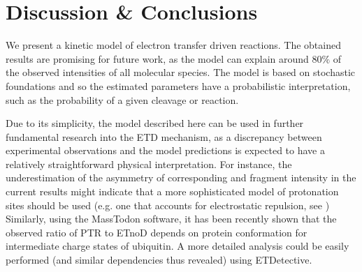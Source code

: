 \documentclass{llncs}
\begin{document}
\section{Discussion \& Conclusions}
We present a kinetic model of electron transfer driven reactions. The obtained results are promising for future work, as the model can explain around $80\%$ of the observed intensities of all molecular species. The model is based on stochastic foundations and so the estimated parameters have a probabilistic interpretation, such as the probability of a given cleavage or reaction.

Due to its simplicity, the model described here can be used in further fundamental research into the ETD mechanism, as a discrepancy between experimental observations and the model predictions is expected to have a relatively straightforward physical interpretation. For instance, the underestimation of the asymmetry of corresponding  and  fragment intensity in the current results might indicate that a more sophisticated model of protonation sites should be used (e.g. one that accounts for electrostatic repulsion, see \cite{Morrison2016-wc}) Similarly, using the {\sc MassTodon} software, it has been recently shown \cite{Lermyte2017-zt} that the observed ratio of PTR to ETnoD depends on protein conformation for intermediate charge states of ubiquitin. A more detailed analysis could be easily performed (and similar dependencies thus revealed) using ETDetective.

\end{document}
